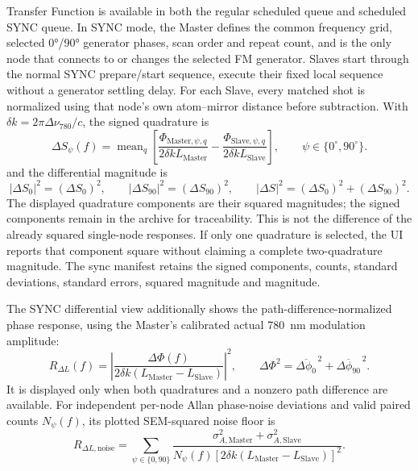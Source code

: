 \documentclass[11pt,oneside,openany]{book}
\begin{document}
Transfer Function is available in both the regular scheduled queue and scheduled SYNC
queue. In SYNC mode, the Master defines the common frequency
grid, selected \ang{0}/\ang{90} generator phases, scan order and repeat count, and is the
only node that connects to or changes the selected FM generator. Slaves start through the normal
SYNC prepare/start sequence, execute their fixed local sequence without a generator
settling delay. For each Slave, every matched shot is normalized using that node's own
atom--mirror distance before subtraction. With
$\delta k=2\pi\Delta\nu_{780}/c$, the signed quadrature is
\begin{equation}
 \Delta S_\psi(f)=\operatorname{mean}_{q}\left[
 \frac{\Phi_{\mathrm{Master},\psi,q}}{2\delta kL_{\mathrm{Master}}}
 -\frac{\Phi_{\mathrm{Slave},\psi,q}}{2\delta kL_{\mathrm{Slave}}}
 \right],\qquad \psi\in\{0^\circ,90^\circ\}.
\end{equation}
and the differential magnitude is
\begin{equation}
 |\Delta S_0|^2=(\Delta S_0)^2,\qquad
 |\Delta S_{90}|^2=(\Delta S_{90})^2,\qquad
 |\Delta S|^2=(\Delta S_0)^2+(\Delta S_{90})^2.
\end{equation}
The displayed quadrature components are their squared magnitudes; the signed components
remain in the archive for traceability. This is not the difference of the already squared
single-node responses. If only one quadrature is selected, the UI reports that component
square without claiming a complete two-quadrature magnitude. The sync manifest retains the signed components,
counts, standard deviations, standard errors, squared magnitude and magnitude.

The SYNC differential view additionally shows the path-difference-normalized phase
response, using the Master's calibrated actual \SI{780}{\nano\meter} modulation amplitude:
\begin{equation}
 R_{\Delta L}(f)=\left|\frac{\Delta\Phi(f)}
 {2\delta k(L_{\mathrm{Master}}-L_{\mathrm{Slave}})}\right|^2,
 \qquad
 \Delta\Phi^2=\overline{\Delta\phi_0}^{\,2}+\overline{\Delta\phi_{90}}^{\,2}.
\end{equation}
It is displayed only when both quadratures and a nonzero path difference are available.
For independent per-node Allan phase-noise deviations and valid paired counts $N_\psi(f)$, its plotted SEM-squared noise floor is
\begin{equation}
 R_{\Delta L,\mathrm{noise}}=
 \sum_{\psi\in\{0,90\}}\frac{\sigma_{A,\mathrm{Master}}^2+\sigma_{A,\mathrm{Slave}}^2}
 {N_\psi(f)[2\delta k(L_{\mathrm{Master}}-L_{\mathrm{Slave}})]^2}.
\end{equation}
\end{document}
